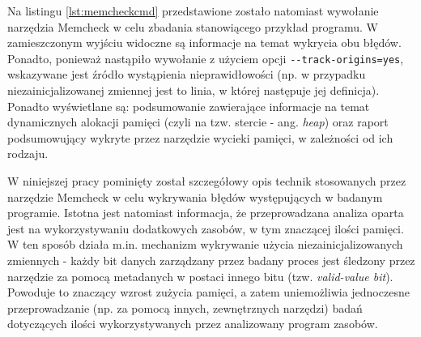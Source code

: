 Na listingu \ref{lst:memcheckcmd} przedstawione zostało natomiast wywołanie narzędzia Memcheck w celu zbadania stanowiącego przykład programu. W zamieszczonym wyjściu widoczne są informacje na temat wykrycia obu błędów. Ponadto, ponieważ nastąpiło wywołanie z użyciem opcji \lstinline{--track-origins=yes}, wskazywane jest źródło wystąpienia nieprawidłowości (np. w przypadku niezainicjalizowanej zmiennej jest to linia, w której następuje jej definicja). Ponadto wyświetlane są: podsumowanie zawierające informacje na temat dynamicznych alokacji pamięci (czyli na tzw. stercie - ang. \emph{heap}) oraz raport podsumowujący wykryte przez narzędzie wycieki pamięci, w zależności od ich rodzaju.



W niniejszej pracy pominięty został szczegółowy opis technik stosowanych przez narzędzie Memcheck w celu wykrywania błędów występujących w badanym programie. Istotna jest natomiast informacja, że przeprowadzana analiza oparta jest na wykorzystywaniu dodatkowych zasobów, w tym znaczącej ilości pamięci. W ten sposób działa m.in. mechanizm wykrywanie użycia niezainicjalizowanych zmiennych - każdy bit danych zarządzany przez badany proces jest śledzony przez narzędzie za pomocą metadanych w postaci innego bitu (tzw. \emph{valid-value bit}). Powoduje to znaczący wzrost zużycia pamięci, a zatem uniemożliwia jednoczesne przeprowadzanie (np. za pomocą innych, zewnętrznych narzędzi) badań dotyczących ilości wykorzystywanych przez analizowany program zasobów.

